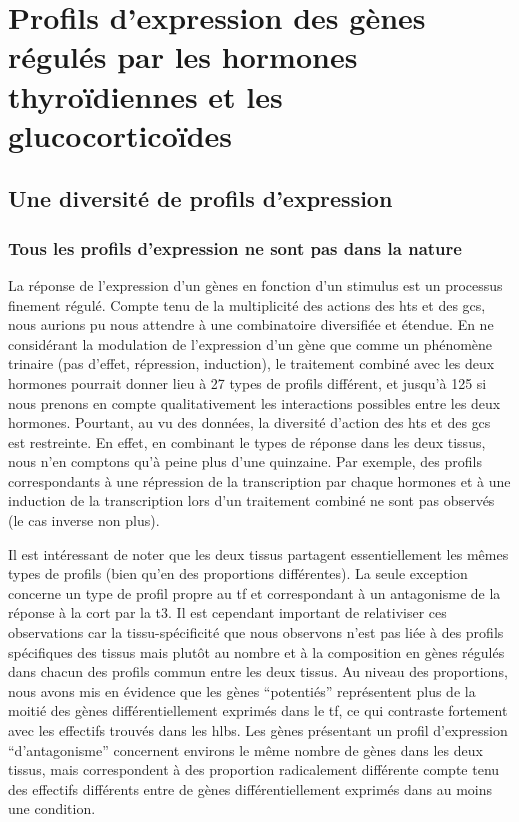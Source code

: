 \documentclass[../main.tex]{subfiles}
\begin{document}
\chapter{Profils d'expression des gènes régulés par les hormones thyroïdiennes et les glucocorticoïdes}


\section{Une diversité de profils d'expression}

	\subsection{Tous les profils d'expression ne sont pas dans la nature}
		La réponse de l'expression d'un gènes en fonction d'un stimulus est un processus finement régulé.
		Compte tenu de la multiplicité des actions des \glspl{ht} et des \glspl{gc}, nous aurions pu nous attendre à une combinatoire diversifiée et étendue.
		En ne considérant la modulation de l'expression d'un gène que comme un phénomène trinaire (pas d'effet, répression, induction), le traitement combiné avec les deux hormones pourrait donner lieu à 27 types de profils différent, et jusqu'à 125 si nous prenons en compte qualitativement les interactions possibles entre les deux hormones.
		Pourtant, au vu des données, la diversité d'action des \glspl{ht} et des \glspl{gc} est restreinte.
		En effet, en combinant le types de réponse dans les deux tissus, nous n'en comptons qu'à peine plus d'une quinzaine.
		Par exemple, des profils correspondants à une répression de la transcription par chaque hormones et à une induction de la transcription lors d'un traitement combiné ne sont pas observés (le cas inverse non plus).
		\par
		Il est intéressant de noter que les deux tissus partagent essentiellement les mêmes types de profils (bien qu'en des proportions différentes).
		La seule exception concerne un type de profil propre au \gls{tf} et correspondant à un antagonisme de la réponse à la \gls{cort} par la \gls{t3}.
		Il est cependant important de relativiser ces observations car la tissu-spécificité que nous observons n'est pas liée à des profils spécifiques des tissus mais plutôt au nombre et à la composition en gènes régulés dans chacun des profils commun entre les deux tissus.
		Au niveau des proportions, nous avons mis en évidence que les gènes ``potentiés'' représentent plus de la moitié des gènes différentiellement exprimés dans le \gls{tf}, ce qui contraste fortement avec les effectifs trouvés dans les \glspl{hlb}.
		Les gènes présentant un profil d'expression ``d'antagonisme'' concernent environs le même nombre de gènes dans les deux tissus, mais correspondent à des proportion radicalement différente compte tenu des effectifs différents entre de gènes différentiellement exprimés dans au moins une condition.
\end{document}
